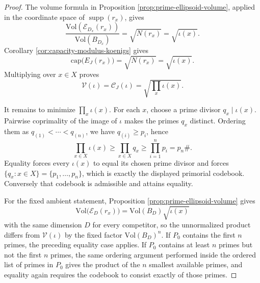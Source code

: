 \begin{proof}
The volume formula in Proposition \ref{prop:prime-ellipsoid-volume}, applied in the coordinate space of \(\operatorname{supp}(r_x)\), gives
\[
\frac{\mathrm{Vol}(\mathcal E_{D_x}(r_x))}{\mathrm{Vol}(B_{D_x})}
=\sqrt{N(r_x)}=\sqrt{\iota(x)}.
\]
Corollary \ref{cor:capacity-modulus-koenigs} gives
\[
\mathrm{cap}\bigl(E_J(r_x)\bigr)=\sqrt{N(r_x)}=\sqrt{\iota(x)}.
\]
Multiplying over \(x\in X\) proves
\[
\mathcal V(\iota)=\mathcal C_J(\iota)=\sqrt{\prod_x\iota(x)}.
\]

It remains to minimize \(\prod_x\iota(x)\). For each \(x\), choose a prime divisor \(q_x\mid\iota(x)\). Pairwise coprimality of the image of \(\iota\) makes the primes \(q_x\) distinct. Ordering them as \(q_{(1)}<\cdots<q_{(n)}\), we have \(q_{(i)}\ge p_i\), hence
\[
\prod_{x\in X}\iota(x)\ge \prod_{x\in X}q_x\ge\prod_{i=1}^{n}p_i=p_n\#.
\]
Equality forces every \(\iota(x)\) to equal its chosen prime divisor and forces \(\{q_x:x\in X\}=\{p_1,\dots,p_n\}\), which is exactly the displayed primorial codebook. Conversely that codebook is admissible and attains equality.

For the fixed ambient statement, Proposition \ref{prop:prime-ellipsoid-volume} gives
\[
\mathrm{Vol}\bigl(\mathcal E_D(r_x)\bigr)=\mathrm{Vol}(B_D)\sqrt{\iota(x)}
\]
with the same dimension \(D\) for every competitor, so the unnormalized product differs from \(\mathcal V(\iota)\) by the fixed factor \(\mathrm{Vol}(B_D)^n\). If \(P_0\) contains the first \(n\) primes, the preceding equality case applies. If \(P_0\) contains at least \(n\) primes but not the first \(n\) primes, the same ordering argument performed inside the ordered list of primes in \(P_0\) gives the product of the \(n\) smallest available primes, and equality again requires the codebook to consist exactly of those primes.
\end{proof}


